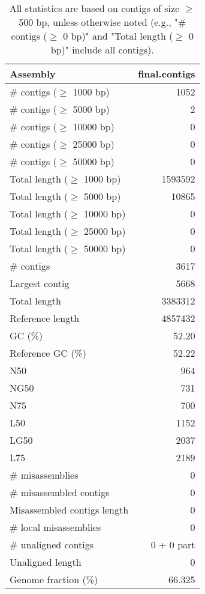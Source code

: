\documentclass[12pt,a4paper]{article}
\begin{document}
\begin{table}[ht]
\begin{center}
\caption{All statistics are based on contigs of size $\geq$ 500 bp, unless otherwise noted (e.g., "\# contigs ($\geq$ 0 bp)" and "Total length ($\geq$ 0 bp)" include all contigs).}
\begin{tabular}{|l*{1}{|r}|}
\hline
Assembly & final.contigs \\ \hline
\# contigs ($\geq$ 1000 bp) & 1052 \\ \hline
\# contigs ($\geq$ 5000 bp) & 2 \\ \hline
\# contigs ($\geq$ 10000 bp) & 0 \\ \hline
\# contigs ($\geq$ 25000 bp) & 0 \\ \hline
\# contigs ($\geq$ 50000 bp) & 0 \\ \hline
Total length ($\geq$ 1000 bp) & 1593592 \\ \hline
Total length ($\geq$ 5000 bp) & 10865 \\ \hline
Total length ($\geq$ 10000 bp) & 0 \\ \hline
Total length ($\geq$ 25000 bp) & 0 \\ \hline
Total length ($\geq$ 50000 bp) & 0 \\ \hline
\# contigs & 3617 \\ \hline
Largest contig & 5668 \\ \hline
Total length & 3383312 \\ \hline
Reference length & 4857432 \\ \hline
GC (\%) & 52.20 \\ \hline
Reference GC (\%) & 52.22 \\ \hline
N50 & 964 \\ \hline
NG50 & 731 \\ \hline
N75 & 700 \\ \hline
L50 & 1152 \\ \hline
LG50 & 2037 \\ \hline
L75 & 2189 \\ \hline
\# misassemblies & 0 \\ \hline
\# misassembled contigs & 0 \\ \hline
Misassembled contigs length & 0 \\ \hline
\# local misassemblies & 0 \\ \hline
\# unaligned contigs & 0 + 0 part \\ \hline
Unaligned length & 0 \\ \hline
Genome fraction (\%) & 66.325 \\ \hline

\end{tabular}
\end{center}
\end{table}
\end{document}
